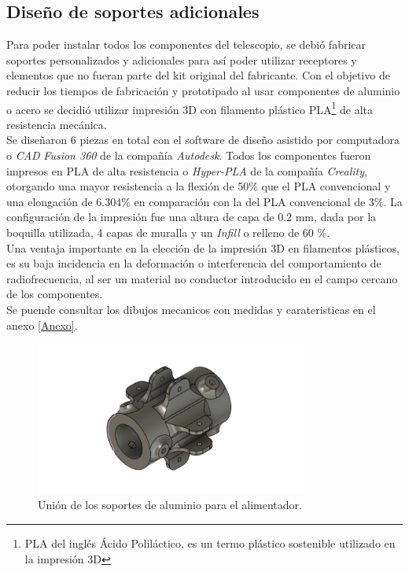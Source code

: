 \subsection{Diseño de soportes adicionales}


Para poder instalar todos los componentes del telescopio, se debió fabricar soportes personalizados y adicionales para así poder utilizar receptores y elementos que no fueran parte del kit original del fabricante. Con el objetivo de reducir los tiempos de fabricación y prototipado al usar componentes de aluminio o acero se decidió utilizar impresión 3D con filamento plástico PLA\footnote{PLA del inglés Ácido Poliláctico, es un termo plástico sostenible utilizado en la impresión 3D} de alta resistencia mecánica.\\

Se diseñaron 6 piezas en total con el software de diseño asistido por computadora o \textit{CAD} \textit{Fusion 360} de la compañía \textit{Autodesk}. Todos los componentes fueron impresos en PLA de alta resistencia o \textit{Hyper-PLA} de la compañía \textit{Creality}, otorgando una mayor resistencia a la flexión de 50\% que el PLA convencional y una elongación de 6.304\% en comparación con la del PLA convencional de 3\%. La configuración de la impresión fue una altura de capa de 0.2 mm, dada por la boquilla utilizada, 4 capas de muralla y un \textit{Infill} o relleno de 60 \%.\\

Una ventaja importante en la elección de la impresión 3D en filamentos plásticos, es su baja incidencia en la deformación o interferencia del comportamiento de radiofrecuencia, al ser un material no conductor introducido en el campo cercano de los componentes.\\

Se puende consultar los dibujos mecanicos con medidas y carateristicas en el anexo \ref{Anexo}.\\

\begin{figure}
    \centering
    \includegraphics[width=0.8\textwidth]{img/soporte3D5}
    \caption{Unión de los soportes de aluminio para el alimentador.}
    \label{fig:ensamble4}
\end{figure}

